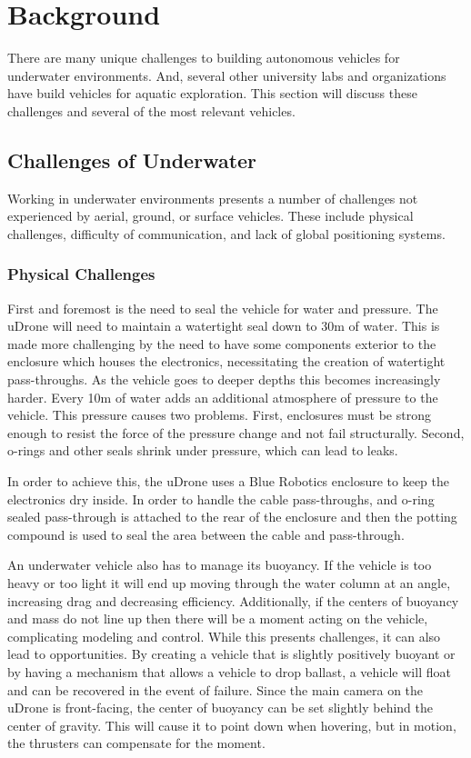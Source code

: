 \chapter{Background}

There are many unique challenges to building autonomous vehicles for underwater environments. And, several other university labs and organizations have build vehicles for aquatic exploration. This section will discuss these challenges and several of the most relevant vehicles. 

\section{Challenges of Underwater}
Working in underwater environments presents a number of challenges not experienced by aerial, ground, or surface vehicles. These include physical challenges, difficulty of communication, and lack of global positioning systems. 
\subsection{Physical Challenges}
First and foremost is the need to seal the vehicle for water and pressure. The uDrone will need to maintain a watertight seal down to 30m of water. This is made more challenging by the need to have some components exterior to the enclosure which houses the electronics, necessitating the creation of watertight pass-throughs. As the vehicle goes to deeper depths this becomes increasingly harder. Every 10m of water adds an additional atmosphere of pressure to the vehicle. This pressure causes two problems. First, enclosures must be strong enough to resist the force of the pressure change and not fail structurally. Second, o-rings and other seals shrink under pressure, which can lead to leaks. 

In order to achieve this, the uDrone uses a Blue Robotics enclosure to keep the electronics dry inside. In order to handle the cable pass-throughs, and o-ring sealed pass-through is attached to the rear of the enclosure and then the potting compound is used to seal the area between the cable and pass-through. 

An underwater vehicle also has to manage its buoyancy. If the vehicle is too heavy or too light it will end up moving through the water column at an angle, increasing drag and decreasing efficiency. Additionally, if the centers of buoyancy and mass do not line up then there will be a moment acting on the vehicle, complicating modeling and control. While this presents challenges, it can also lead to opportunities. By creating a vehicle that is slightly positively buoyant or by having a mechanism that allows a vehicle to drop ballast, a vehicle will float and can be recovered in the event of failure. Since the main camera on the uDrone is front-facing, the center of buoyancy can be set slightly behind the center of gravity. This will cause it to point down when hovering, but in motion, the thrusters can compensate for the moment. 

